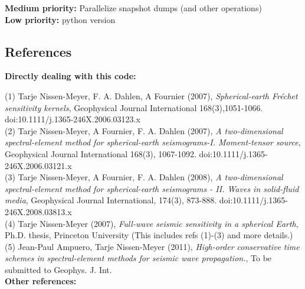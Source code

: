 \documentclass[11pt,letter,fleqn,english,notitlepage]{article}
\begin{document}
\noindent\textbf{Medium priority:}
Parallelize snapshot dumps (and other operations)\\

\noindent\textbf{Low priority:} python version

\subsection{References}

\noindent \textbf{Directly dealing with this code:}\vspace*{0.2cm}

(1) Tarje Nissen-Meyer, F. A. Dahlen, A Fournier (2007),
\textit{Spherical-earth Fr\'{e}chet sensitivity kernels},        
Geophysical Journal International 168(3),1051-1066. 
doi:10.1111/j.1365-246X.2006.03123.x                \\
                                                        
(2) Tarje Nissen-Meyer, A Fournier, F. A. Dahlen (2007), 
\textit{A two-dimensional spectral-element method for
spherical-earth seismograms-I. Moment-tensor source}, 
Geophysical Journal International 168(3), 1067-1092. 
doi:10.1111/j.1365-246X.2006.03121.x                 \\
                                                       
(3) Tarje Nissen-Meyer, A Fournier, F. A. Dahlen (2008),  
\textit{A two-dimensional spectral-element method for   
spherical-earth seismograms - II. Waves in solid-fluid media},
Geophysical Journal International, 174(3), 873-888.
doi:10.1111/j.1365-246X.2008.03813.x\\

(4) Tarje Nissen-Meyer (2007),
\textit{Full-wave seismic sensitivity in a spherical Earth},
Ph.D. thesis, Princeton University
(This includes refs (1)-(3) and more details.)\\

(5) Jean-Paul Ampuero, Tarje Nissen-Meyer (2011),
\textit{High-order conservative time schemes in spectral-element methods 
for seismic wave propagation.}, To be submitted to Geophys. J. Int.\\


\noindent \textbf{Other references:}\vspace*{0.2cm}
\end{document}
